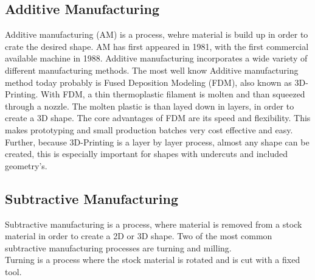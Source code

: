 \subsection{Additive Manufacturing}
Additive manufacturing (AM) is a process, wehre material is build up in order to crate the desired shape. AM has first appeared in 1981, with the first commercial available machine in 1988.
Additive manufacturing incorporates a wide variety of different manufacturing methods. The most well know Additive manufacturing method today probably is Fused Deposition Modeling (FDM), also known as 3D-Printing.
With FDM, a thin thermoplastic filament is molten and than squeezed through a nozzle. The molten plastic is than layed down in layers, in order to create a 3D shape.
The core advantages of FDM are its speed and flexibility. This makes prototyping and small production batches very cost effective and easy. 
Further, because 3D-Printing is a layer by layer process, almost any shape can be created, this is especially important for shapes with undercuts and included geometry's.\cite{FraunhoferInstitutAM}

\subsection{Subtractive Manufacturing}
Subtractive manufacturing is a process, where material is removed from a stock material in order to create a 2D or 3D shape. Two of the most common subtractive manufacturing processes are turning and milling.\\
Turning is a process where the stock material is rotated and is cut with a fixed tool. 


